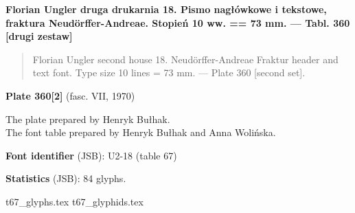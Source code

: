 \documentclass[12pt]{article}
\newcommand{\bg}{\begingl}
\newcommand{\pismoPL}[1]{{\relsize{2}\Junicode\textbf{#1}}}
\newcommand{\pismoEN}[1]{{\relsize{1}\Junicode\begin{quote}#1\end{quote}}}
\newcommand{\plate}[3]{\textbf{Plate #1} (fasc. #2, #3)}
\newcommand{\exampleBib}[1]{{\relsize{2}\Junicode\textbf{The
      example:}\\[2ex] CATALOGUS LIBRORUM \textbf{#1}}}
\newcommand{\exampleDesc}[1]{{\relsize{0}\Junicode#1}}
\newcommand{\exampleDig}[1]{{\relsize{0}\Junicode \textbf{Digitization(s) [JSB]:} #1}}
\newcommand{\exampleLib}[1]{{\relsize{0}\Junicode \textbf{Library:} #1}}
\newcommand{\fontID}[2]{{\relsize{1}\Junicode\textbf{Font identifier} (JSB): #1 (table #2)}}
\newcommand{\fontstat}[1]{{\relsize{1}\Junicode\textbf{Statistics} (JSB): #1 glyphs.}}
\newcommand{\exampleRef}[1]{{\relsize{0}\Junicode \textbf{References:} #1}}
\newcommand{\examplePage}[1]{{Page reference: \relsize{0}\Junicode#1}}
\begin{document}
 \pismoPL{Florian Ungler druga drukarnia 18. Pismo nagłówkowe i
   tekstowe, fraktura Neudörffer-Andreae. Stopień 10 ww. == 73 mm. —
   Tabl. 360 [drugi zestaw]}
  
 \pismoEN{Florian Ungler second house 18. Neudörffer-Andreae Fraktur
   header and text font. Type size 10 lines = 73 mm. — Plate 360
   [second set].}

\plate{360[2]}{VII}{1970}

The plate prepared by Henryk Bułhak.\\
The font table prepared by Henryk Bułhak and Anna Wolińska.

\bigskip










\bigskip

\fontID{U2-18}{67}

\fontstat{84}

  {t67_glyphs.tex}
  {t67_glyphids.tex}
\end{document}
